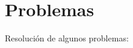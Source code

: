 \section{Problemas}

Resolución de algunos problemas:

\inputminted{cpp}{../CodeForces/CPP/1097B_petr_and_a_combination_lock.cpp}
